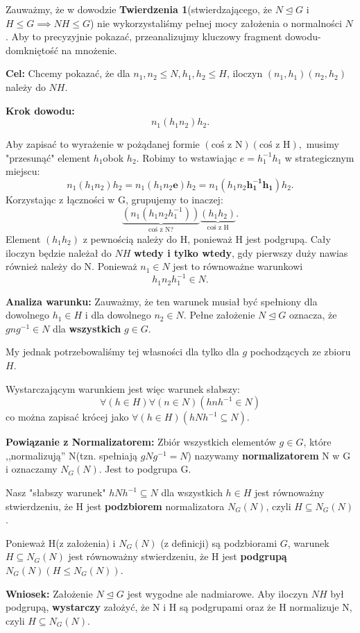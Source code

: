 \begin{remark}
	Zauważmy, że w dowodzie \textbf{Twierdzenia 1}(stwierdzającego, że $N\unlhd G$ i $H\le G \implies NH\le G$) nie wykorzystaliśmy pełnej mocy założenia o normalności $N$. Aby to precyzyjnie pokazać, przeanalizujmy kluczowy fragment dowodu- domkniętość na mnożenie.

	\noindent\textbf{Cel: } Chcemy pokazać, że dla $n_1,n_2 \le N, h_1,h_2\le H$, iloczyn $\left( n_1,h_1 \right)\left( n_2,h_2 \right) $ należy do $NH$.

	\noindent\textbf{Krok dowodu: } \[n_1\left( h_1n_2 \right)h_2 .\]

	Aby zapisać to wyrażenie w pożądanej formie $\left( \text{coś z N} \right)\left( \text{coś z H} \right), $ musimy "przesunąć" element $h_1$obok $h_2$. Robimy to wstawiając $e = h_1^{-1}h_1$ w strategicznym miejscu:
	\[
		n_1\left( h_1n_2 \right) h_2 = n_1\left( h_1n_2\bm{e} \right) h_2 = n_1\left( h_1n_2\bm{h_1^{-1}h_1} \right)h_2
	.\] 
	Korzystając z łączności w G, grupujemy to inaczej:
	\[
		\underbrace{\left( n_1\left( h_1n_2h_1^{-1} \right)  \right)}_{\text{coś z N?}}\underbrace{\left(h_1h_2\right)}_{\text{coś z H}}
	.\] 
	Element $\left( h_1h_2 \right) $ z pewnością należy do H, ponieważ H jest podgrupą. Cały iloczyn będzie należał do $NH$ \textbf{wtedy i tylko wtedy}, gdy pierwszy duży nawias również należy do N. Ponieważ $n_1 \in N$ jest to równoważne warunkowi
	\[
	h_1n_2h_1^{-1}\in N
	.\] 

	\noindent\textbf{Analiza warunku: } Zauważmy, że ten warunek musiał być spełniony dla dowolnego $h_1\in H$ i dla dowolnego $n_2\in N$. Pełne założenie $N\unlhd G$ oznacza, że $gng^{-1} \in N$ dla \textbf{wszystkich} $g\in G$.

	My jednak potrzebowaliśmy tej własności dla tylko dla $g$ pochodzących ze zbioru $H$. 

	Wystarczającym warunkiem jest więc warunek słabszy:
	\[
	\forall\left(h\in H\right)\forall\left(n\in N\right)\left( hnh^{-1}\in N \right)   
	\]
	co można zapisać krócej jako $\forall\left(h\in H\right)\left( hNh^{-1}\subseteq N \right).$

	\noindent\textbf{Powiązanie z Normalizatorem: } Zbiór wszystkich elementów $g\in G$, które ,,normalizują'' N(tzn. spełniają $gNg^{-1} = N$) nazywamy \textbf{normalizatorem} N w G i oznaczamy $N_{G}\left( N \right) $. Jest to podgrupa G.


	Nasz "słabszy warunek" $hNh^{-1}\subseteq N$ dla wszystkich $h\in H$ jest równoważny stwierdzeniu, że H jest \textbf{podzbiorem} normalizatora $N_{G}\left( N \right) $, czyli $H\subseteq N_{G}\left( N \right) $.

	Ponieważ H(z założenia) i $N_{G}\left( N \right) $ (z definicji) są podzbiorami $G$, warunek $H \subseteq N_{G}\left( N \right) $ jest równoważny stwierdzeniu, że H jest \textbf{podgrupą} $N_{G}\left( N \right) \left( H \le N_{G}\left( N \right)  \right) $.

	\noindent\textbf{Wniosek: } Założenie $N\unlhd G$ jest wygodne ale nadmiarowe. Aby iloczyn $NH$ był podgrupą, \textbf{wystarczy} założyć, że N i H są podgrupami oraz że H normalizuje N, czyli $H\subseteq N_{G}\left( N \right) $.  
\end{remark}

